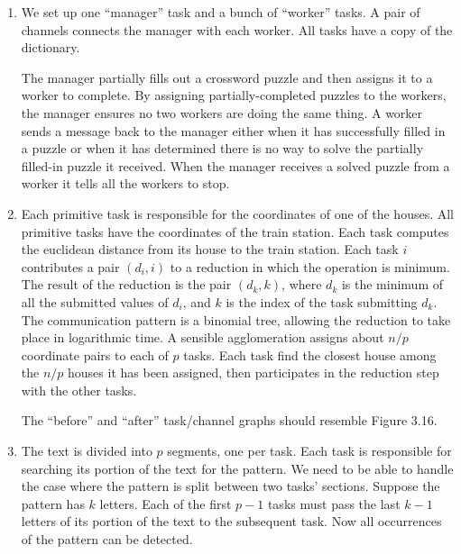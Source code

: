 \begin{enumerate}
      \begin{center}
      \end{center}

\item We set up one ``manager'' task and a bunch of ``worker'' tasks.
      A pair of channels connects the manager with each worker.
      All tasks have a copy of the dictionary.

      \begin{center}
      \end{center}

      The manager partially fills out a crossword puzzle and then assigns
      it to a worker to complete. By assigning partially-completed puzzles
      to the workers, the manager ensures no two workers are doing the same
      thing. A worker sends a message back to the manager either when it has
      successfully filled in a puzzle or when it has determined there is no 
      way to solve the partially filled-in puzzle it received.
      When the manager receives a solved puzzle from a worker it tells all
      the workers to stop.

\item Each primitive task is responsible for the coordinates of one of the
      houses. All primitive tasks have the coordinates of the train station.
      Each task computes the euclidean distance from its house to the train
      station.
      Each task $i$ contributes a pair $(d_i, i)$ to a reduction in which
      the operation is minimum. The result of the reduction is the pair
      $(d_k, k)$, where $d_k$ is the minimum of all the submitted values
      of $d_i$, and $k$ is the index of the task submitting $d_k$.
      The communication pattern is a binomial tree, allowing the reduction
      to take place in logarithmic time.
      A sensible agglomeration assigns about $n/p$ coordinate pairs to each 
      of $p$ tasks. Each task find the closest house among the $n/p$ houses
      it has been assigned, then participates in the reduction step with the
      other tasks.

      The ``before'' and ``after'' task/channel graphs should resemble
      Figure 3.16.

\item The text is divided into $p$ segments, one per task.
      Each task is responsible for searching its portion of the text for the
      pattern.
      We need to be able to handle the case where the pattern is split between
      two tasks' sections.
      Suppose the pattern has $k$ letters.
      Each of the first $p-1$ tasks must pass the last $k-1$ letters of its
      portion of the text to the subsequent task.
      Now all occurrences of the pattern can be detected.


\end{enumerate}
